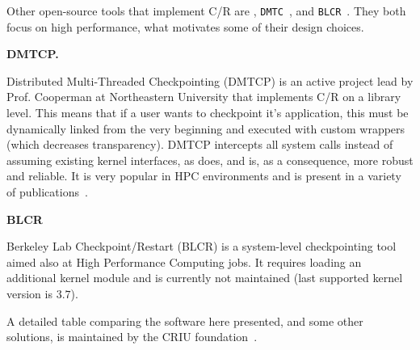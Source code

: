 Other open-source tools that implement C/R are \criu, \texttt{DMTC}~\cite{dmtcp}, and \texttt{BLCR}~\cite{blcr}.
They both focus on high performance, what motivates some of their design choices.

\textbf{DMTCP.}

Distributed Multi-Threaded Checkpointing (DMTCP) is an active project lead by Prof. Cooperman at Northeastern University that implements C/R on a library level.
This means that if a user wants to checkpoint it's application, this must be dynamically linked from the very beginning and executed with custom wrappers (which decreases transparency).
DMTCP intercepts all system calls instead of assuming existing kernel interfaces, as \criu does, and is, as a consequence, more robust and reliable.
It is very popular in HPC environments and is present in a variety of publications~\cite{Ansel2009,Garg2019}.

\textbf{BLCR}

Berkeley Lab Checkpoint/Restart (BLCR) is a system-level checkpointing tool aimed also at High Performance Computing jobs.
It requires loading an additional kernel module and is currently not maintained (last supported kernel version is $3.7$).

A detailed table comparing the software here presented, and some other solutions, is maintained by the CRIU foundation~\cite{criu-comparison}.
